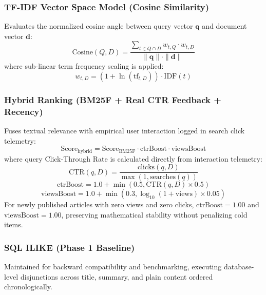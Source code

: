 \documentclass[conference]{IEEEtran}
\begin{document}
\subsubsection{TF-IDF Vector Space Model (Cosine Similarity)}
Evaluates the normalized cosine angle between query vector $\mathbf{q}$ and document vector $\mathbf{d}$:
\begin{equation}
\text{Cosine}(Q, D) = \frac{\sum_{t \in Q \cap D} w_{t, Q} \cdot w_{t, D}}{\|\mathbf{q}\| \cdot \|\mathbf{d}\|}
\end{equation}
where sub-linear term frequency scaling is applied:
\begin{equation}
w_{t, D} = (1 + \ln(\text{tf}_{t, D})) \cdot \text{IDF}(t)
\end{equation}

\subsubsection{Hybrid Ranking (BM25F + Real CTR Feedback + Recency)}
Fuses textual relevance with empirical user interaction logged in search click telemetry:
\begin{equation}
\text{Score}_{\text{hybrid}} = \text{Score}_{\text{BM25F}} \cdot \text{ctrBoost} \cdot \text{viewsBoost}
\end{equation}
where query Click-Through Rate is calculated directly from interaction telemetry:
\begin{equation}
\text{CTR}(q, D) = \frac{\text{clicks}(q, D)}{\max(1, \text{searches}(q))}
\end{equation}
\begin{equation}
\text{ctrBoost} = 1.0 + \min(0.5, \text{CTR}(q, D) \times 0.5)
\end{equation}
\begin{equation}
\text{viewsBoost} = 1.0 + \min(0.3, \log_{10}(1 + \text{views}) \times 0.05)
\end{equation}
For newly published articles with zero views and zero clicks, $\text{ctrBoost} = 1.00$ and $\text{viewsBoost} = 1.00$, preserving mathematical stability without penalizing cold items.

\subsubsection{SQL ILIKE (Phase 1 Baseline)}
Maintained for backward compatibility and benchmarking, executing database-level disjunctions across title, summary, and plain content ordered chronologically.
\end{document}
